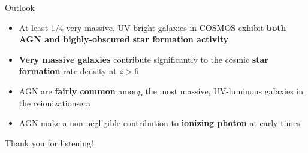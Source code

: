 \documentclass{beamer}
\begin{document}
\begin{frame}{Outlook}
    \begin{itemize}
        \item[\bullet] At least $1/4$ very massive, UV-bright galaxies in COSMOS exhibit \textbf{both AGN and highly-obscured star formation activity}
        \item[\bullet] \textbf{Very massive galaxies} contribute significantly to the cosmic \textbf{star formation} rate density at $z>6$
        \item[\bullet] AGN are \textbf{fairly common} among the most massive, UV-luminous galaxies in the reionization-era
        \item[\bullet] AGN make a non-negligible contribution to \textbf{ionizing photon} at early times
    \end{itemize}
\end{frame}

\begin{frame}
    \begin{center}
        \Huge Thank you for listening!
    \end{center}
\end{frame}
\end{document}
